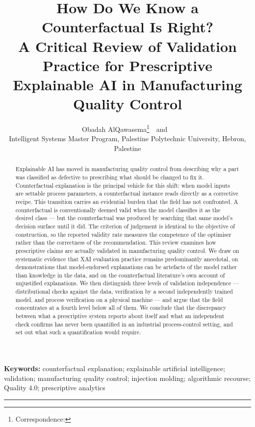 \documentclass[11pt,a4paper]{article}
\title{\bfseries How Do We Know a Counterfactual Is Right?\\
A Critical Review of Validation Practice for Prescriptive\\
Explainable AI in Manufacturing Quality Control}
\author{%
  Obadah AlQawasema\thanks{Correspondence: \TODO{email}}\ \ and \ \TODO{Supervisor name}\\[0.4em]
  \small Intelligent Systems Master Program, Palestine Polytechnic University, Hebron, Palestine
}
\date{}
\begin{document}
\maketitle

\begin{abstract}
\noindent
Explainable AI has moved in manufacturing quality control from describing why a part was classified as defective to prescribing what should be changed to fix it. Counterfactual explanation is the principal vehicle for this shift: when model inputs are settable process parameters, a counterfactual instance reads directly as a corrective recipe. This transition carries an evidential burden that the field has not confronted. A counterfactual is conventionally deemed valid when the model classifies it as the desired class --- but the counterfactual was produced by searching that same model's decision surface until it did. The criterion of judgement is identical to the objective of construction, so the reported validity rate measures the competence of the optimiser rather than the correctness of the recommendation. This review examines how prescriptive claims are actually validated in manufacturing quality control. We draw on systematic evidence that XAI evaluation practice remains predominantly anecdotal, on demonstrations that model-endorsed explanations can be artefacts of the model rather than knowledge in the data, and on the counterfactual literature's own account of unjustified explanations. We then distinguish three levels of validation independence --- distributional checks against the data, verification by a second independently trained model, and process verification on a physical machine --- and argue that the field concentrates at a fourth level below all of them. We conclude that the discrepancy between what a prescriptive system reports about itself and what an independent check confirms has never been quantified in an industrial process-control setting, and set out what such a quantification would require.
\end{abstract}

\noindent\textbf{Keywords:} counterfactual explanation; explainable artificial intelligence; validation; manufacturing quality control; injection molding; algorithmic recourse; Quality 4.0; prescriptive analytics

\vspace{1em}\hrule\vspace{1em}

\end{document}
